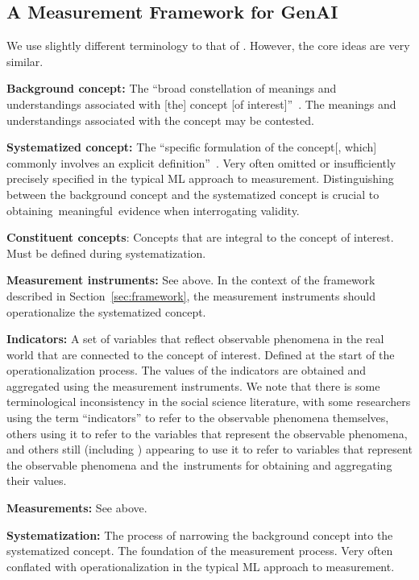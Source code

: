 \documentclass{article}
\begin{document}
\subsection{A Measurement Framework for GenAI}

We use slightly different terminology to that of \citet{adcock2001measurement}. However, the core ideas are very similar. 

\textbf{Background concept:} The ``broad constellation of meanings
and understandings associated with [the] concept [of
interest]''~\citep{adcock2001measurement}. The meanings and understandings associated with the concept may be contested.

\textbf{Systematized concept:} The ``specific formulation
of the concept[, which] commonly involves an explicit
definition''~\citep{adcock2001measurement}. Very often omitted or insufficiently precisely specified in the typical ML approach to measurement. Distinguishing between the background concept and
the systematized concept is crucial to obtaining~meaningful~evidence when interrogating validity. 

\textbf{Constituent concepts}: Concepts that are integral to the concept of interest. Must be defined during systematization.

\textbf{Measurement instruments:} See above. In the context of the framework described in Section~\ref{sec:framework}, the measurement instruments should operationalize the systematized concept.

\textbf{Indicators:} A set of variables that reflect observable phenomena in the real world that are connected to the concept of interest. Defined at the start of the operationalization process. The values of the indicators are obtained and aggregated using the measurement instruments. We note that there is some terminological inconsistency in the social science literature, with some researchers using the term ``indicators'' to refer to the observable phenomena themselves, others using it to refer to the variables that represent the observable phenomena, and others still (including \citet{adcock2001measurement})
appearing to use it to refer to variables that represent the
observable phenomena and the~instruments for obtaining and aggregating their values.

\textbf{Measurements:} See above.

\textbf{Systematization:} The process
of narrowing the background concept into the systematized
concept. The foundation of the measurement process. Very often conflated with operationalization in the typical ML approach to measurement.
\end{document}
